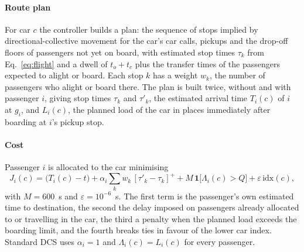 \documentclass[12pt,a4paper]{article}
\newcommand{\pos}[1]{[#1]^{+}}
\begin{document}
\paragraph{Route plan} For car $c$ the controller builds a plan: the sequence of stops implied by directional-collective movement for the car's car calls, pickups and the drop-off floors of passengers not yet on board, with estimated stop times $\tau_k$ from Eq.~\eqref{eq:flight} and a dwell of $t_o+t_c$ plus the transfer times of the passengers expected to alight or board. Each stop $k$ has a weight $w_k$, the number of passengers who alight or board there. The plan is built twice, without and with passenger $i$, giving stop times $\tau_k$ and $\tau'_k$, the estimated arrival time $T_i(c)$ of $i$ at $g_i$, and $L_i(c)$, the planned load of the car in places immediately after boarding at $i$'s pickup stop.

\paragraph{Cost} Passenger $i$ is allocated to the car minimising
\begin{equation}
J_i(c)=\bigl(T_i(c)-t\bigr)+\alpha_i\sum_{k} w_k\,\pos{\tau'_k-\tau_k}+M\,\mathbf{1}\bigl[\Lambda_i(c)>Q\bigr]+\varepsilon\,\mathrm{idx}(c),
\label{eq:cost}
\end{equation}
with $M=600$~s and $\varepsilon=10^{-6}$~s. The first term is the passenger's own estimated time to destination, the second the delay imposed on passengers already allocated to or travelling in the car, the third a penalty when the planned load exceeds the boarding limit, and the fourth breaks ties in favour of the lower car index. Standard DCS uses $\alpha_i=1$ and $\Lambda_i(c)=L_i(c)$ for every passenger.
\end{document}
